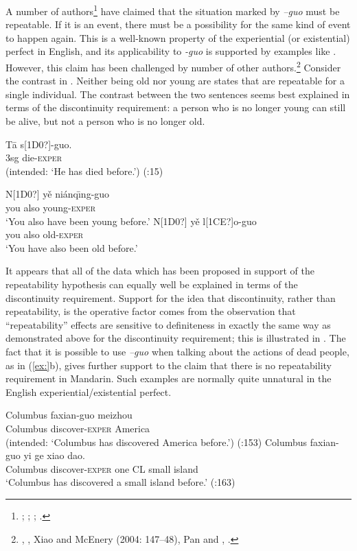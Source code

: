 A number of authors\footnote{\citet{Ma1977}; \citet[230]{LiThompson1981}; \citet{Yeh1996}; \citet[268]{Smith1997}.} have claimed that the situation marked by \textit{–guo} must be repeatable. If it is an event, there must be a possibility for the same kind of event to happen again. This is a well-known property of the experiential (or existential) perfect in English, and its applicability to \textit{-guo} is supported by examples like . However, this claim has been challenged by number of other authors.\footnote{\citet{Chen1979}, \citet{Iljic1990}, Xiao and McEnery (2004: 147–48), Pan and \citet{Lee2004}, \citet{Lin2007}.} Consider the contrast in . Neither being old nor young are states that are repeatable for a single individual. The contrast between the two sentences seems best explained in terms of the discontinuity requirement: a person who is no longer young can still be alive, but not a person who is no longer old.


\ea
\gll *T\=a  s[1D0?]-guo.\\
 3sg  die-\textsc{exper}\\
\glt (intended: ‘He has died before.’)  (\citealt{Ma1977}:15)
\z

\ea
\ea  \gll N[1D0?]  yě  niánq\={\i}ng-guo\\
you  also  young-\textsc{exper}\\
\glt ‘You also have been young before.’ 
\ex \gll *N[1D0?]  yě  l[1CE?]o-guo\\
you  also  old-\textsc{exper}\\
\glt ‘You have also been old before.’
\z \z


It appears that all of the data which has been proposed in support of the repeatability hypothesis can equally well be explained in terms of the discontinuity requirement. Support for the idea that discontinuity, rather than repeatability, is the operative factor comes from the observation that “repeatability” effects are sensitive to definiteness in exactly the same way as demonstrated above for the discontinuity requirement; this is illustrated in . The fact that it is possible to use \textit{–guo} when talking about the actions of dead people, as in (\ref{ex:}b), gives further support to the claim that there is no repeatability requirement in Mandarin. Such examples are normally quite unnatural in the English experiential/existential perfect.


\ea
\ea \gll  *Columbus  faxian-guo  meizhou\\
  Columbus  discover-\textsc{exper}  America\\
\glt (intended: ‘Columbus has discovered America before.’)  (\citealt{Yeh1996}:153)
 \ex \gll Columbus  faxian-guo  yi  ge  xiao  dao.\\
Columbus  discover-\textsc{exper}  one  CL  small  island\\
\glt ‘Columbus has discovered a small island before.’  (\citealt{Yeh1996}:163)
\z \z


